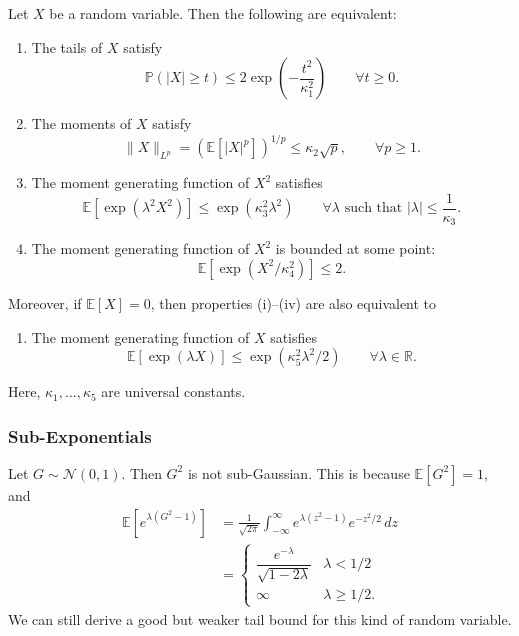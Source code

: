 \begin{thm}
Let $X$ be a random variable. Then the following are equivalent:
\begin{enumerate}
    \item[(i)] The tails of $X$ satisfy
    \[
    \mathbb{P}(|X| \geq t) \leq 2 \exp\!\left( -\frac{t^2}{\kappa_1^2} \right) \qquad \forall t \geq 0.
    \]
    
    \item[(ii)] The moments of $X$ satisfy
    \[
    \|X\|_{L^p} = \left( \mathbb{E}[|X|^p] \right)^{1/p} \leq \kappa_2 \sqrt{p}, \qquad \forall p \geq 1.
    \]
    
    \item[(iii)] The moment generating function of $X^2$ satisfies
    \[
    \mathbb{E}[\exp(\lambda^2 X^2)] \leq \exp(\kappa_3^2 \lambda^2) \qquad \forall \lambda \text{ such that } |\lambda| \leq \frac{1}{\kappa_3}.
    \]
    
    \item[(iv)] The moment generating function of $X^2$ is bounded at some point:
    \[
    \mathbb{E}[\exp(X^2 / \kappa_4^2)] \leq 2.
    \]
\end{enumerate}

Moreover, if $\mathbb{E}[X] = 0$, then properties (i)--(iv) are also equivalent to
\begin{enumerate}
    \item[(v)] The moment generating function of $X$ satisfies
    \[
    \mathbb{E}[\exp(\lambda X)] \leq \exp(\kappa_5^2 \lambda^2 / 2) \qquad \forall \lambda \in \mathbb{R}.
    \]
\end{enumerate}

Here, $\kappa_1, \ldots, \kappa_5$ are universal constants.
\end{thm}

\subsubsection{Sub-Exponentials}
Let $G \sim \mathcal{N}(0, 1)$. Then $G^2$ is not sub-Gaussian. This is because $\mathbb{E}[G^2] = 1$, and
\begin{align*}
\mathbb{E}[e^{\lambda(G^2 - 1)}] 
&= \frac{1}{\sqrt{2\pi}} \int_{-\infty}^{\infty} e^{\lambda(z^2 - 1)} e^{-z^2/2} \, dz \\
&= \begin{cases} \dfrac{e^{-\lambda}}{\sqrt{1 - 2\lambda}} & \lambda < 1/2 \\ \infty & \lambda \geq 1/2. \end{cases}
\end{align*}
We can still derive a good but weaker tail bound for this kind of random variable.

